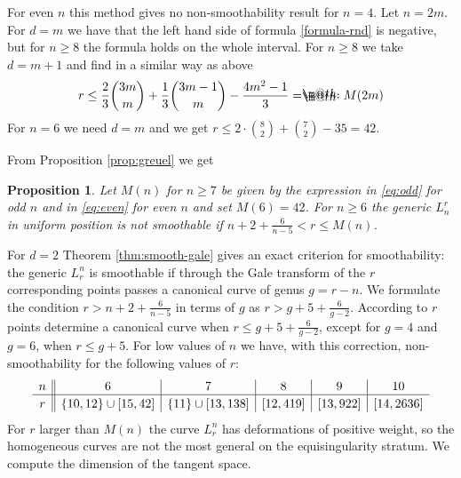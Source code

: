 \documentclass{amsart}
\makeatletter
\newcommand*{\eqdef}{=\mathrel{\rlap{%
                     \raisebox{0.3ex}{$\m@th\cdot$}}%
                     \raisebox{-0.3ex}{$\m@th\cdot$}}}
\newtheorem{prop}[thm]{Proposition}
\theoremstyle{definition}
\theoremstyle{remark}
\makeatother
\begin{document}
For even $n$ this method gives no non-smoothability result for $n=4$. 
Let $n=2m$.  For $d=m$ we have that the left hand side of formula \eqref{formula-rnd}
is negative, but for $n\geq 8$ the formula holds on the whole interval.
For $n\geq 8$  we take $d=m+1$
and find in a similar way as above
\begin{equation}\label{eq:even}
r\leq \frac23\binom{3m}{m}+ \frac13\binom{3m-1}{m}-\frac{4m^2-1}3 \eqdef M(2m)
\end{equation}
%
For $n=6$ we need $d=m$ and we get $r\leq 2 \cdot\binom{8}{2}+\binom{7}{2}-35 = 42$. %

From Proposition \ref{prop:greuel} we get
\begin{prop}\label{prop:interval}
Let $M(n)$ for $n\geq 7$ be given by the expression
in  \eqref{eq:odd} for odd $n$ and in  \eqref{eq:even} for even $n$ and set
$M(6)=42$. For $n\geq 6$ the generic $L_n^r$ in uniform position is not smoothable
if $n+2+\frac6{n-5}<r\leq M(n)$.  
\end{prop}

For $d=2$ Theorem \ref{thm:smooth-gale} gives an exact criterion for smoothability:
the generic $L_r^n$ is smoothable if through the  Gale transform of the $r$ corresponding 
points passes a canonical curve of genus $g=r-n$.  We formulate  the condition  $r> n+2+\frac6{n-5}$  
in terms of $g$ as  $r>g+5+\frac 6{g-2}$. According to  \cite{St} $r$ points determine
a canonical curve  when    $r\leq g+5+\frac 6{g-2}$,
except for $g=4$ and $g=6$, when $r\leq g+5$.  For low values of $n$ we have, with this correction,
non-smoothability for the following values of $r$:
\[
\begin{array}{c||c|c|c|c|c}
n&6         &   7          &  8          &  9       &  10\\  \hline
\vphantom{A^{A^A}} r&\{10,12\}\cup[15,42]&\{11\}\cup[13,138] & [12,419] &  [13,922]  &  [14,2636] 
\end{array}
\]
%
For $r$ larger than $M(n)$ the curve  $L_r^n$ has 
deformations of positive weight, so the homogeneous curves are not the most general
on the equisingularity stratum. 
We compute the dimension of the tangent space.
\end{document}
